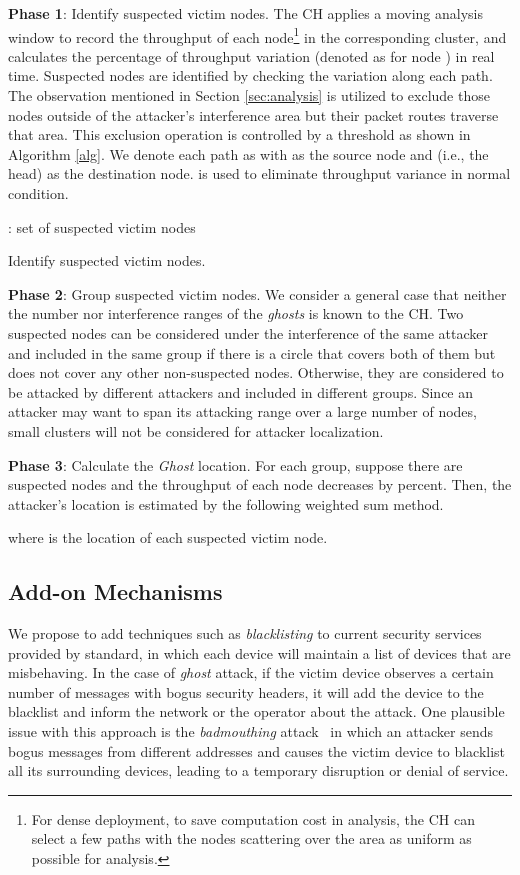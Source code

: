 \documentclass[10pt,journal,cspaper,compsoc]{IEEEtran}
\begin{document}
{\bf Phase 1}: Identify suspected victim nodes. The CH applies a moving analysis window to record the throughput of each node\footnote{For dense deployment, to save computation cost in analysis, the CH can select a few paths with the nodes scattering over the area as uniform as possible for analysis.} in the corresponding cluster, and calculates the percentage of throughput variation (denoted as  for node ) in real time. Suspected nodes are identified by checking the variation along each path. The observation mentioned in Section \ref{sec:analysis} is utilized to exclude those nodes outside of the attacker's interference area but their packet routes traverse that area. This exclusion operation is controlled by a threshold  as shown in Algorithm \ref{alg}. We denote each path as  with  as the source node and  (i.e., the head) as the destination node.  is used to eliminate throughput variance in normal condition.
\begin{algorithm}[ht]
    : set of suspected victim nodes\;
\caption{Identify suspected victim nodes.}\label{alg}
\end{algorithm}

{\bf Phase 2}: Group suspected victim nodes. We consider a general case that neither the number nor interference ranges of the {\em ghosts} is known to the CH. Two suspected nodes can be considered under the interference of the same attacker and included in the same group if there is a circle that covers both of them but does not cover any other non-suspected nodes. Otherwise, they are considered to be attacked by different attackers and included in different groups. Since an attacker may want to span its attacking range over a large number of nodes, small clusters will not be considered for attacker localization.

{\bf Phase 3}: Calculate the {\em Ghost} location. For each group, suppose there are  suspected nodes and the throughput of each node decreases by  percent. Then, the attacker's location is estimated by the following weighted sum method.

where  is the location of each suspected victim node.

\subsection{Add-on Mechanisms}\label{sec:addonmechanisms}
We propose to add techniques such as {\em blacklisting} to current security services provided by standard, in which each device will maintain a list of devices that are misbehaving. In the case of {\em ghost} attack, if the victim device observes a certain number of messages with bogus security headers, it will add the device to the blacklist and inform the network or the operator about the attack. One plausible issue with this approach is the {\em badmouthing} attack~\cite{DEVU} in which an attacker sends bogus messages from different addresses and causes the victim device to blacklist all its surrounding devices, leading to a temporary disruption or denial of service.
\end{document}
